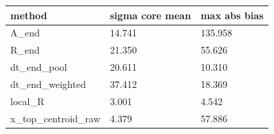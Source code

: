 \begin{tabular}{lll}
method & sigma core mean & max abs bias \\
\hline
A\_end & 14.741 & 135.958 \\
R\_end & 21.350 & 55.626 \\
dt\_end\_pool & 20.611 & 10.310 \\
dt\_end\_weighted & 37.412 & 18.369 \\
local\_R & 3.001 & 4.542 \\
x\_top\_centroid\_raw & 4.379 & 57.886 \\
\end{tabular}
